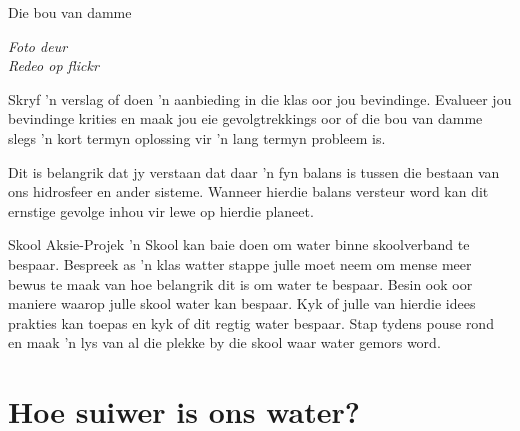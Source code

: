 \begin{Investigation}{Die bou van damme}
\begin{minipage}{.3\textwidth}
\begin{center}
\textsl{Foto deur\\ Redeo op flickr}
 \end{center}
\end{minipage}
\label{m38138*id08322432}
Skryf  'n verslag of doen  'n aanbieding in die klas oor jou bevindinge. Evalueer jou bevindinge krities en maak jou eie gevolgtrekkings oor of die bou van damme slegs  'n kort termyn oplossing vir  'n lang termyn probleem is.
\end{Investigation}
      \label{m38138*id342412}Dit is belangrik dat jy verstaan dat daar  'n fyn balans is tussen die bestaan van ons hidrosfeer en ander sisteme. Wanneer hierdie balans versteur word kan dit ernstige gevolge inhou vir lewe op hierdie planeet.
\label{m38138*secfhsst!!!underscore!!!id1065}
            \begin{project}{Skool Aksie-Projek
      }
            \nopagebreak
 'n Skool kan baie doen om water binne skoolverband te bespaar. Bespreek as  'n klas watter stappe julle moet neem om mense meer bewus te maak van hoe belangrik dit is om water te bespaar. Besin ook oor maniere waarop julle skool water kan bespaar. Kyk of julle van hierdie idees prakties kan toepas en kyk of dit regtig water bespaar. Stap tydens pouse rond en maak  'n lys van al die plekke by die skool waar water gemors word.
\end{project}

\section{Hoe suiwer is ons water?}
            \nopagebreak


